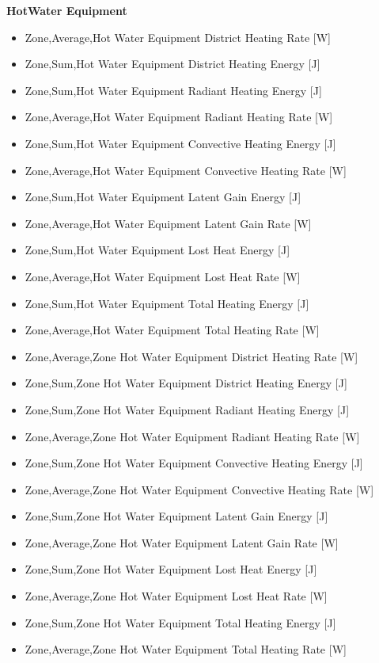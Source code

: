 \textbf{HotWater Equipment}

\begin{itemize}
\item
  Zone,Average,Hot Water Equipment District Heating Rate {[}W{]}
\item
  Zone,Sum,Hot Water Equipment District Heating Energy {[}J{]}
\item
  Zone,Sum,Hot Water Equipment Radiant Heating Energy {[}J{]}
\item
  Zone,Average,Hot Water Equipment Radiant Heating Rate {[}W{]}
\item
  Zone,Sum,Hot Water Equipment Convective Heating Energy {[}J{]}
\item
  Zone,Average,Hot Water Equipment Convective Heating Rate {[}W{]}
\item
  Zone,Sum,Hot Water Equipment Latent Gain Energy {[}J{]}
\item
  Zone,Average,Hot Water Equipment Latent Gain Rate {[}W{]}
\item
  Zone,Sum,Hot Water Equipment Lost Heat Energy {[}J{]}
\item
  Zone,Average,Hot Water Equipment Lost Heat Rate {[}W{]}
\item
  Zone,Sum,Hot Water Equipment Total Heating Energy {[}J{]}
\item
  Zone,Average,Hot Water Equipment Total Heating Rate {[}W{]}
\item
  Zone,Average,Zone Hot Water Equipment District Heating Rate {[}W{]}
\item
  Zone,Sum,Zone Hot Water Equipment District Heating Energy {[}J{]}
\item
  Zone,Sum,Zone Hot Water Equipment Radiant Heating Energy {[}J{]}
\item
  Zone,Average,Zone Hot Water Equipment Radiant Heating Rate {[}W{]}
\item
  Zone,Sum,Zone Hot Water Equipment Convective Heating Energy {[}J{]}
\item
  Zone,Average,Zone Hot Water Equipment Convective Heating Rate {[}W{]}
\item
  Zone,Sum,Zone Hot Water Equipment Latent Gain Energy {[}J{]}
\item
  Zone,Average,Zone Hot Water Equipment Latent Gain Rate {[}W{]}
\item
  Zone,Sum,Zone Hot Water Equipment Lost Heat Energy {[}J{]}
\item
  Zone,Average,Zone Hot Water Equipment Lost Heat Rate {[}W{]}
\item
  Zone,Sum,Zone Hot Water Equipment Total Heating Energy {[}J{]}
\item
  Zone,Average,Zone Hot Water Equipment Total Heating Rate {[}W{]}
\end{itemize}

